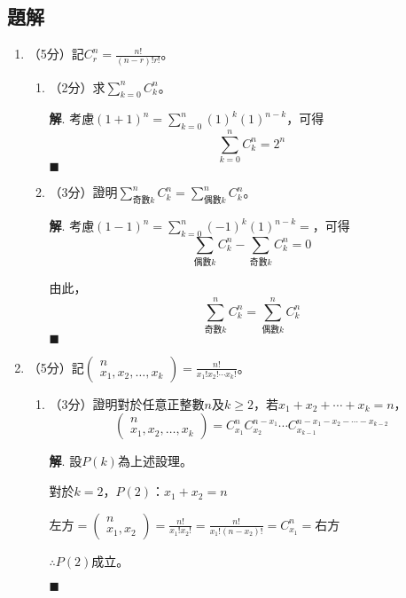 \documentclass[12pt]{article}
\newenvironment*{sol}{\par \textbf{解}.}{\hfill$\blacksquare$}
\begin{document}
    \subsection*{題解}

    \begin{enumerate}
        \item （5分）記$C_r^n=\frac{n!}{(n-r)!r!}$。\begin{enumerate}
            \item （2分）求$\sum_{k=0}^n C_k^n$。\begin{sol}
                考慮$(1+1)^n=\sum_{k=0}^{n}(1)^k(1)^{n-k}$，可得$$\sum_{k=0}^{n}C_k^n=2^n$$
            \end{sol}
            \item （3分）證明$\sum_{\textrm{奇數}k}^n C_k^n=\sum_{\textrm{偶數}k}^n C_k^n$。\begin{sol}
                考慮$(1-1)^n=\sum_{k=0}^{n}(-1)^k(1)^{n-k}=$，可得$$\sum_{\textrm{偶數}k}C_k^n-\sum_{\textrm{奇數}k}C_k^n=0$$

                由此，$$\sum_{\textrm{奇數}k}^n C_k^n=\sum_{\textrm{偶數}k}^n C_k^n$$
            \end{sol}
        \end{enumerate}
        \item （5分）記$\begin{pmatrix}
            n\\x_1,x_2,\dots,x_k
        \end{pmatrix}=\frac{n!}{x_1!x_2!\cdots x_k!}$。\begin{enumerate}
            \item （3分）證明對於任意正整數$n$及$k\geq 2$，若$x_1+x_2+\cdots+x_k=n$，$$\begin{pmatrix}
                n\\x_1,x_2,\dots,x_k
            \end{pmatrix}=C_{x_1}^n C_{x_2}^{n-x_1}\cdots C_{x_{k-1}}^{n-x_1-x_2-\cdots-x_{k-2}}$$\begin{sol}
                設$P(k)$為上述設理。

                對於$k=2$，$P(2)$：$x_1+x_2=n$

                左方$=\begin{pmatrix}
                    n\\x_1,x_2
                \end{pmatrix}=\frac{n!}{x_1!x_2!}=\frac{n!}{x_1!(n-x_2)!}=C_{x_1}^n=$右方

                $\therefore P(2)$成立。


\end{sol}
\end{enumerate}
\end{enumerate}
\end{document}
